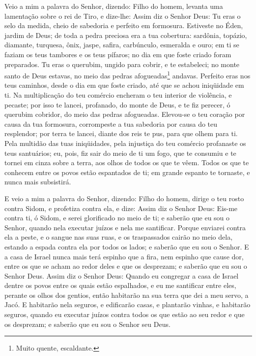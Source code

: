 Veio a mim a palavra do Senhor, dizendo: Filho do homem,
levanta uma lamentação sobre o rei de Tiro, e dize-lhe: Assim diz o
Senhor Deus: Tu eras o selo da medida, cheio de sabedoria e perfeito
em formosura. Estiveste no Éden, jardim de Deus; de toda a
pedra preciosa era a tua cobertura: sardônia, topázio, diamante,
turquesa, ônix, jaspe, safira, carbúnculo, esmeralda e ouro; em ti
se faziam os teus tambores e os teus pífaros; no dia em que foste
criado foram preparados. Tu eras o querubim, ungido para
cobrir, e te estabeleci; no monte santo de Deus estavas, no meio das
pedras afogueadas\footnote{Muito quente, escaldante.} andavas.
Perfeito eras nos teus caminhos, desde o dia em que foste
criado, até que se achou iniqüidade em ti. Na multiplicação
do teu comércio encheram o teu interior de violência, e pecaste; por
isso te lancei, profanado, do monte de Deus, e te fiz perecer, ó
querubim cobridor, do meio das pedras afogueadas. Elevou-se o
teu coração por causa da tua formosura, corrompeste a tua sabedoria
por causa do teu resplendor; por terra te lancei, diante dos reis te
pus, para que olhem para ti. Pela multidão das tuas
iniqüidades, pela injustiça do teu comércio profanaste os teus
santuários; eu, pois, fiz sair do meio de ti um fogo, que te
consumiu e te tornei em cinza sobre a terra, aos olhos de todos os
que te vêem. Todos os que te conhecem entre os povos estão
espantados de ti; em grande espanto te tornaste, e nunca mais
subsistirá.

E veio a mim a palavra do Senhor, dizendo: Filho do homem,
dirige o teu rosto contra Sidom, e profetiza contra ela, e
dize: Assim diz o Senhor Deus: Eis-me contra ti, ó Sidom, e serei
glorificado no meio de ti; e saberão que eu sou o Senhor, quando
nela executar juízos e nela me santificar. Porque enviarei
contra ela a peste, e o sangue nas suas ruas, e os traspassados
cairão no meio dela, estando a espada contra ela por todos os lados;
e saberão que eu sou o Senhor. E a casa de Israel nunca mais
terá espinho que a fira, nem espinho que cause dor, entre os que se
acham ao redor deles e que os desprezam; e saberão que eu sou o
Senhor Deus. Assim diz o Senhor Deus: Quando eu congregar a
casa de Israel dentre os povos entre os quais estão espalhados, e eu
me santificar entre eles, perante os olhos dos gentios, então
habitarão na sua terra que dei a meu servo, a Jacó. E
habitarão nela seguros, e edificarão casas, e plantarão vinhas, e
habitarão seguros, quando eu executar juízos contra todos os que
estão ao seu redor e que os desprezam; e saberão que eu sou o Senhor
seu Deus.

